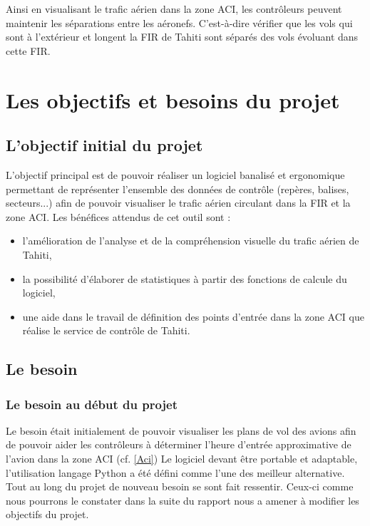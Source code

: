 Ainsi en visualisant le trafic aérien dans la zone ACI, les contrôleurs peuvent maintenir les séparations entre les aéronefs. C'est-à-dire vérifier que les vols qui sont à l’extérieur et longent la FIR de Tahiti sont séparés des vols évoluant dans cette FIR.

\section{Les objectifs et besoins du projet}
    \subsection{L'objectif initial du projet}
L’objectif principal est de pouvoir réaliser un logiciel banalisé et ergonomique permettant de
représenter l’ensemble des données de contrôle (repères, balises, secteurs...) afin de pouvoir
visualiser le trafic aérien circulant dans la FIR et la zone ACI.
Les bénéfices attendus de cet outil sont :
\begin{itemize}
\item l’amélioration de l’analyse et de la compréhension visuelle du trafic aérien de Tahiti,
\item la possibilité d’élaborer de statistiques à partir des fonctions de calcule du logiciel,
\item une aide dans le travail de définition des points d’entrée dans la zone ACI que réalise le
service de contrôle de Tahiti.
\end{itemize}

    \subsection{Le besoin}
        \subsubsection{Le besoin au début du projet}
Le besoin était initialement de pouvoir visualiser les plans de vol des avions afin de pouvoir aider les contrôleurs à déterminer l'heure d'entrée approximative de l'avion dans la zone ACI (cf. \vref{Aci})
Le logiciel devant être portable et adaptable, l'utilisation langage Python a été défini comme l'une des meilleur alternative.
Tout au long du projet de nouveau besoin se sont fait ressentir. Ceux-ci comme nous pourrons le constater dans la suite du rapport nous a amener à modifier les objectifs du projet.

